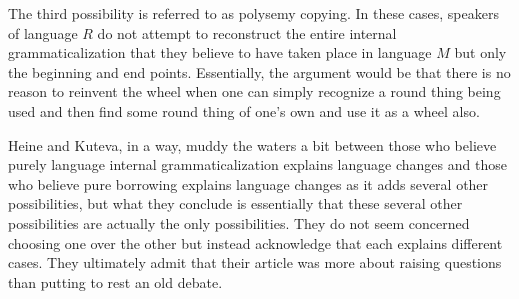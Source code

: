 \documentclass{article}
\begin{document}
  The third possibility is referred to as polysemy copying.
  In these cases, speakers of language $R$ do not attempt to reconstruct the entire internal grammaticalization that they believe to have taken place in language $M$ but only the beginning and end points.
  Essentially, the argument would be that there is no reason to reinvent the wheel when one can simply recognize a round thing being used and then find some round thing of one's own and use it as a wheel also.

  Heine and Kuteva, in a way, muddy the waters a bit between those who believe purely language internal grammaticalization explains language changes and those who believe pure borrowing explains language changes as it adds several other possibilities, but what they conclude is essentially that these several other possibilities are actually the only possibilities.
  They do not seem concerned choosing one over the other but instead acknowledge that each explains different cases.
  They ultimately admit that their article was more about raising questions than putting to rest an old debate.
  \printbibliography
\end{document}
